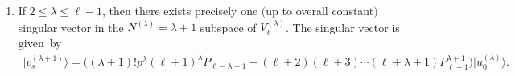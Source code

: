 \begin{lemma}
\begin{enumerate}
\begin{gather}
\end{gather}
This implies that there exists no singular vectors in the level $ N^{(\lambda)} $ subspaces if $ 1 {\leq} N^{(\lambda)}
{\leq} \lambda$.
\item[$iii)$] If $ 2 \leq \lambda \leq \ell-1$, then there exists precisely one $($up to overall constant$)$ singular vector in the
$ N^{(\lambda)} = \lambda + 1 $ subspace of $ V^{(\lambda)}_{\ell}$.
The singular vector is given~by
\begin{gather}
\big|v_s^{(\lambda{+}1)}\big\rangle  = \big(  (\lambda+1)!  p^{\lambda} (\ell+1)^{\lambda} P_{\ell{-}\lambda{-}1} \!- (\ell+2) (\ell+3)
\cdots (\ell+\lambda+1) P_{\ell{-}1}^{\lambda{+}1}  \big)\! \big|u_0^{(\lambda)}\big\rangle .\!\!\!\!
\label{SVinQuotientSpace}
\end{gather}
\end{enumerate}
\end{lemma}

